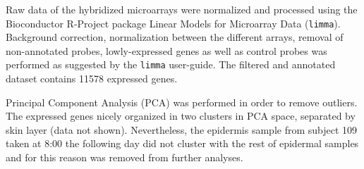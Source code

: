 Raw data of the hybridized microarrays were normalized and processed using the Bioconductor R-Project package Linear Models for Microarray Data (\texttt{limma}). Background correction, normalization between the different arrays, removal of non-annotated probes, lowly-expressed genes as well as control probes was performed as suggested by the \texttt{limma} user-guide. The filtered and annotated dataset contains 11578 expressed genes. %

Principal Component Analysis (PCA) was performed in order to remove outliers. The expressed genes nicely organized in two clusters in PCA space, separated by skin layer (data not shown). Nevertheless, the epidermis sample from subject 109 taken at 8:00 the following day did not cluster with the rest of epidermal samples and for this reason was removed from further analyses. 

